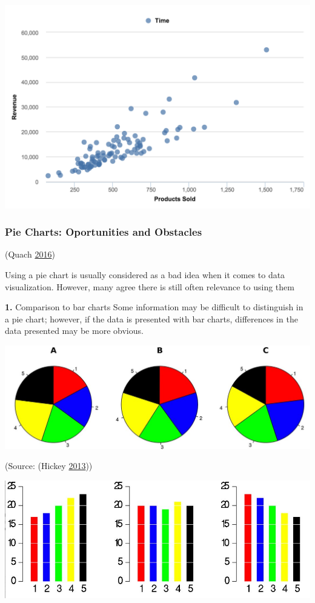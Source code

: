 \documentclass[]{book}
\begin{document}
\includegraphics{images/scatter-plot-diag.png}

\hypertarget{pie-charts-oportunities-and-obstacles}{%
\subsubsection{Pie Charts: Oportunities and Obstacles}\label{pie-charts-oportunities-and-obstacles}}

(Quach \protect\hyperlink{ref-quach-penny}{2016})

Using a pie chart is usually considered as a bad idea when it comes to data visualization. However, many agree there is still often relevance to using them

\textbf{1.} Comparison to bar charts
Some information may be difficult to distinguish in a pie chart; however, if the data is presented with bar charts, differences in the data presented may be more obvious.

\includegraphics{images/hickey-before.jpg}

(Source: (Hickey \protect\hyperlink{ref-hickey-pie-worst}{2013}))

\includegraphics{images/hickey-after.jpg}
\end{document}
